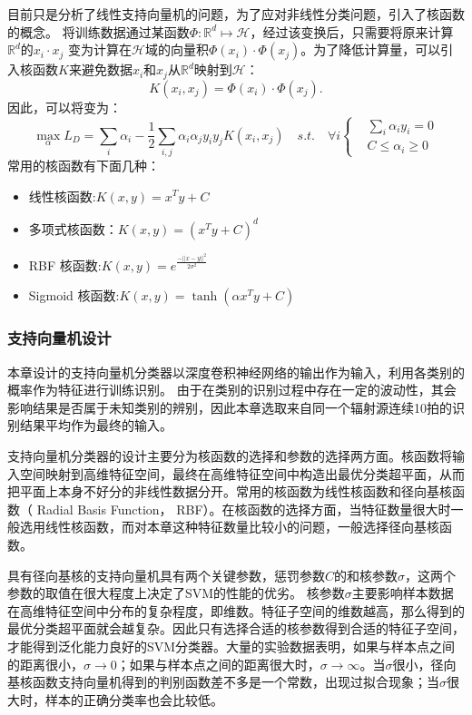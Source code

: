 目前只是分析了线性支持向量机的问题，为了应对非线性分类问题，引入了核函数的概念。
将训练数据通过某函数$\Phi:\mathbb{R}^d\mapsto\mathcal{H}$，经过该变换后，只需要将原来计算$\mathbb{R}^d$的$x_i\cdot x_j$ 变为计算在$\mathcal{H}$域的向量积$\Phi(x_i)\cdot\Phi(x_j)$。为了降低计算量，可以引入核函数$K$来避免数据$x_i$和$x_j$从$\mathbb{R}^d$映射到$\mathcal{H}$：
\begin{equation}
	K(x_i,x_j)=\Phi(x_i)\cdot\Phi(x_j).
\end{equation}
因此，可以将变为：
\begin{equation}
	\max \limits_{\alpha} L_D=\sum_i{\alpha_i}-\frac{1}{2}\sum_{i,j}\alpha_i\alpha_jy_iy_j K(x_i,x_j)\quad s.t. \quad \forall i
	\left\{
		\begin{aligned}
	   &\sum_i{\alpha_iy_i}=0  \\
	   &C \leq \alpha_i \geq 0
	   \end{aligned}
		\right.
\end{equation}
常用的核函数有下面几种：
\begin{itemize}
	\item 线性核函数:$K(x,y)=x^Ty+C$
	\item 多项式核函数：$K(x,y)=(x^Ty+C)^d$
	\item RBF 核函数:$K(x,y)=e^{\frac{-||x-y||^2}{2\sigma^2}}$
	\item Sigmoid 核函数:$K(x,y)=\tanh(\alpha x^Ty+C)$
\end{itemize}
\subsubsection{支持向量机设计}
本章设计的支持向量机分类器以深度卷积神经网络的输出作为输入，利用各类别的概率作为特征进行训练识别。
由于在类别的识别过程中存在一定的波动性，其会影响结果是否属于未知类别的辨别，因此本章选取来自同一个辐射源连续10拍的识别结果平均作为最终的输入。

支持向量机分类器的设计主要分为核函数的选择和参数的选择两方面。核函数将输入空间映射到高维特征空间，最终在高维特征空间中构造出最优分类超平面，从而把平面上本身不好分的非线性数据分开。常用的核函数为线性核函数和径向基核函数（ Radial Basis Function， RBF）。在核函数的选择方面，当特征数量很大时一般选用线性核函数，而对本章这种特征数量比较小的问题，一般选择径向基核函数。

具有径向基核的支持向量机具有两个关键参数，惩罚参数$C$的和核参数$\sigma$，这两个参数的取值在很大程度上决定了SVM的性能的优劣。
核参数$\sigma$主要影响样本数据在高维特征空间中分布的复杂程度，即维数。特征子空间的维数越高，那么得到的最优分类超平面就会越复杂。因此只有选择合适的核参数得到合适的特征子空间，才能得到泛化能力良好的SVM分类器。大量的实验数据表明，如果与样本点之间的距离很小，$\sigma \rightarrow 0$；如果与样本点之间的距离很大时，$\sigma \rightarrow \infty$。当$\sigma$很小，径向基核函数支持向量机得到的判别函数差不多是一个常数，出现过拟合现象；当$\sigma$很大时，样本的正确分类率也会比较低。

